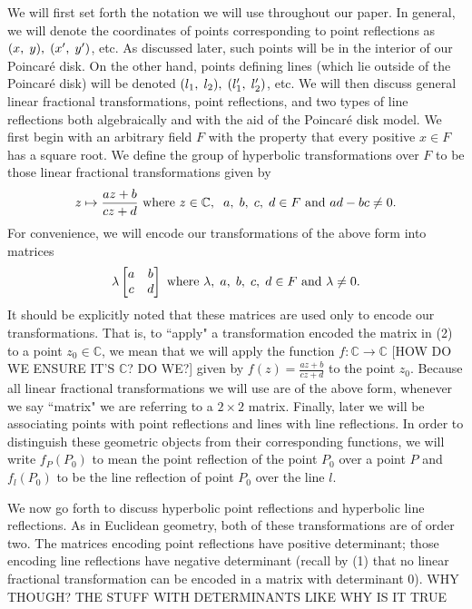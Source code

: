 \documentclass[12pt]{article}
\newcommand{\C}{\mathbb{C}}
\newcommand{\poincare}{Poincar\'{e} }
\newcommand{\ttc}{, \hspace{1mm}}
\newcommand{\lftmat}[4]{\begin{bmatrix} {#1} & {#2} \\ {#3} & {#4} \end{bmatrix}}
\newcommand{\stanlftmat}{\lftmat{a}{b}{c}{d}}
\begin{document}
We will first set forth the notation we will use throughout our paper. In general, we will denote the coordinates of points corresponding to point reflections as $(x \ttc y) \ttc (x' \ttc y')$, etc. As discussed later, such points will be in the interior of our \poincare disk. On the other hand, points defining lines (which lie outside of the \poincare disk) will be denoted $(l_1 \ttc l_2) \ttc (l_1' \ttc l_2')$, etc. We will then discuss general linear fractional transformations, point reflections, and two types of line reflections both algebraically and with the aid of the \poincare disk model. We first begin with an arbitrary field $F$ with the property that every positive $x \in F$ has a square root. We define the group of hyperbolic transformations over $F$ to be those linear fractional transformations given by
\begin{equation} 
z \mapsto \frac{az+b}{cz+d} \text{ where } z \in \C, \hspace{2mm} a \ttc b \ttc c \ttc d \in F \text{ and } ad-bc \neq 0. 
\end{equation}
For convenience, we will encode our transformations of the above form into matrices 
\begin{equation} 
\lambda \stanlftmat \text{ where } \lambda \ttc a \ttc b \ttc c \ttc d \in F \text{ and } \lambda \neq 0. 
\end{equation}
It should be explicitly noted that these matrices are used only to encode our transformations. That is, to ``apply" a transformation encoded the matrix in (2) to a point $z_0 \in \C$, we mean that we will apply the function $f: \C \rightarrow \C$ [HOW DO WE ENSURE IT'S $\C$? DO WE?] given by $f(z) = \frac{az+b}{cz+d}$ to the point $z_0$. Because all linear fractional transformations we will use are of the above form, whenever we say ``matrix" we are referring to a $2 \times 2$ matrix. Finally, later we will be associating points with point reflections and lines with line reflections. In order to distinguish these geometric objects from their corresponding functions, we will write  $f_P(P_0)$ to mean the point reflection of the point $P_0$ over a point $P$ and $f_l(P_0)$ to be the line reflection of point $P_0$ over the line $l$.

We now go forth to discuss hyperbolic point reflections and hyperbolic line reflections. As in Euclidean geometry, both of these transformations are of order two. The matrices encoding point reflections have positive determinant; those encoding line reflections have negative determinant (recall by (1) that no linear fractional transformation can be encoded in a matrix with determinant 0). WHY THOUGH? THE STUFF WITH DETERMINANTS LIKE WHY IS IT TRUE
\end{document}
